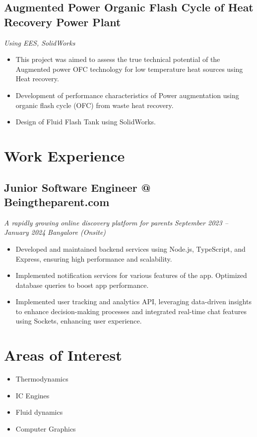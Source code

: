 \documentclass[a4paper]{article}
\begin{document}
\subsection{Augmented Power Organic Flash Cycle of Heat Recovery Power Plant}
\textit{Using EES, SolidWorks}
\begin{itemize}
	\item This project was aimed to assess the true technical potential of the Augmented power OFC technology for low temperature heat sources using Heat recovery.
	\item Development of performance characteristics of Power augmentation using organic flash cycle (OFC) from waste heat recovery.
	\item Design of Fluid Flash Tank using SolidWorks.
\end{itemize}

\section{Work Experience}
\subsection{Junior Software Engineer @ Beingtheparent.com}
\textit{A rapidly growing online discovery platform for parents}
\hfill
\textit{September 2023 -- January 2024}
\textbar
\textit{ Bangalore (Onsite)}
\begin{itemize}
	\item Developed and maintained backend services using Node.js, TypeScript, and Express, ensuring high performance and scalability.
	\item Implemented notification services for various features of the app. Optimized database queries to boost app performance.
	\item Implemented user tracking and analytics API, leveraging data-driven insights to enhance decision-making processes and integrated real-time chat features using Sockets, enhancing user experience.
\end{itemize}

\section{Areas of Interest}
\begin{itemize}
	\item Thermodynamics
	\item IC Engines
	\item Fluid dynamics
	\item Computer Graphics
\end{itemize}
\end{document}
